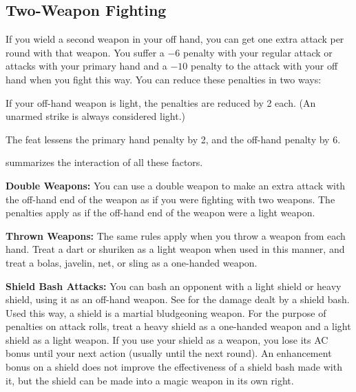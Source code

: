 \subsection{Two-Weapon Fighting}
If you wield a second weapon in your off hand, you can get one extra attack per round with that weapon. You suffer a $-6$ penalty with your regular attack or attacks with your primary hand and a $-10$ penalty to the attack with your off hand when you fight this way. You can reduce these penalties in two ways:

\begin{itemize*}
\item If your off-hand weapon is light, the penalties are reduced by 2 each. (An unarmed strike is always considered light.)
\item The  feat lessens the primary hand penalty by 2, and the off-hand penalty by 6.
\end{itemize*}

 summarizes the interaction of all these factors.


\textbf{Double Weapons:} You can use a double weapon to make an extra attack with the off-hand end of the weapon as if you were fighting with two weapons. The penalties apply as if the off-hand end of the weapon were a light weapon.

\textbf{Thrown Weapons:} The same rules apply when you throw a weapon from each hand. Treat a dart or shuriken as a light weapon when used in this manner, and treat a bolas, javelin, net, or sling as a one-handed weapon.

\textbf{Shield Bash Attacks:} You can bash an opponent with a light shield or heavy shield, using it as an off-hand weapon. See  for the damage dealt by a shield bash. Used this way, a shield is a martial bludgeoning weapon. For the purpose of penalties on attack rolls, treat a heavy shield as a one-handed weapon and a light shield as a light weapon. If you use your shield as a weapon, you lose its AC bonus until your next action (usually until the next round). An enhancement bonus on a shield does not improve the effectiveness of a shield bash made with it, but the shield can be made into a magic weapon in its own right.

